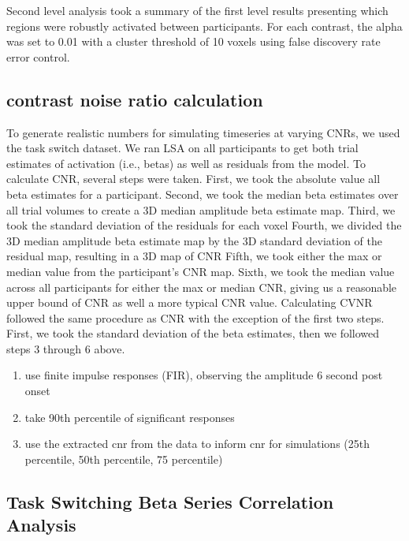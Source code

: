 \documentclass[10pt,letterpaper]{article}
\begin{document}
Second level analysis took a summary of the first level results presenting which
regions were robustly activated between participants.
For each contrast, the alpha was set to 0.01 with a cluster threshold of 10 voxels using
false discovery rate error control.

\subsection*{contrast noise ratio calculation}
To generate realistic numbers for simulating timeseries at varying CNRs,
we used the task switch dataset.
We ran LSA on all participants to get both trial estimates of activation (i.e., betas)
as well as residuals from the model.
To calculate CNR, several steps were taken.
First, we took the absolute value all beta estimates for a participant.
Second, we took the median beta estimates over all trial volumes
to create a 3D median amplitude beta estimate map.
Third, we took the standard deviation of the residuals for each voxel
Fourth, we divided the 3D median amplitude beta estimate map by the 3D standard deviation of the residual map,
resulting in a 3D map of CNR
Fifth, we took either the max or median value from the participant's CNR map.
Sixth, we took the median value across all participants for either the max or median CNR,
giving us a reasonable upper bound of CNR as well a more typical CNR value.
Calculating CVNR followed the same procedure as CNR with the exception of the first two steps.
First, we took the standard deviation of the beta estimates, then we followed steps 3 through 6 above.
\begin{enumerate}
  \item use finite impulse responses (FIR), observing the amplitude 6 second post onset
  \item take 90th percentile of significant responses
  \item use the extracted cnr from the data to inform cnr for simulations (25th percentile, 50th percentile, 75 percentile)
\end{enumerate}

\subsection*{Task Switching Beta Series Correlation Analysis}

\end{document}
